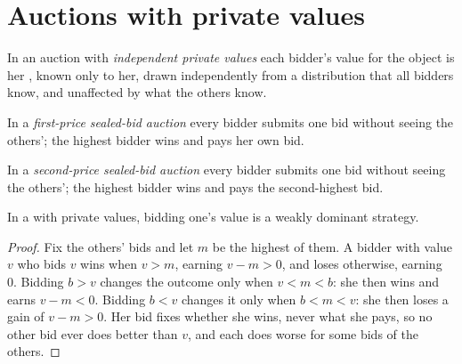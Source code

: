 \section{Auctions with private values}\label{sec:b2:bayesian-games:auctions}

\begin{definition}\label{def:b2:bayesian-games:private-values}
In an auction with \emph{independent private values} each bidder's value for
the object is her , known only to her, drawn independently from a distribution that all bidders know, and
unaffected by what the others know.
\end{definition}

\begin{definition}\label{def:b2:bayesian-games:first-price}
In a \emph{first-price sealed-bid auction} every bidder submits one bid
without seeing the others'; the highest bidder wins and pays her own bid.
\end{definition}

\begin{definition}\label{def:b2:bayesian-games:second-price}
In a \emph{second-price sealed-bid auction} every bidder submits one
bid without seeing the others'; the highest bidder wins and pays the second-highest bid.
\end{definition}

\begin{proposition}\label{prop:b2:bayesian-games:truthful}
In a  with private values, bidding one's value is a weakly dominant strategy.
\end{proposition}

\begin{proof}
Fix the others' bids and let $m$ be the highest of them. A bidder with value $v$ who bids $v$ wins when $v > m$, earning $v
- m > 0$, and loses otherwise, earning 0. Bidding $b > v$ changes the outcome only when $v < m < b$: she then wins and earns
$v - m < 0$. Bidding $b < v$ changes it only when $b < m < v$: she then loses a gain of $v - m > 0$. Her bid fixes whether she
wins, never what she pays, so no other bid ever does better than $v$, and each does worse for some bids of the others.
\end{proof}


